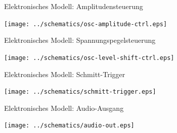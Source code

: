 \documentclass{beamer}
\begin{document}
\begin{frame}[fragile]{Elektronisches Modell: Amplitudensteuerung}
  \begin{center}
    \texttt{[image: ../schematics/osc-amplitude-ctrl.eps]}
  \end{center}
\end{frame}

\begin{frame}[fragile]{Elektronisches Modell: Spannungspegelsteuerung}
  \begin{center}
    \texttt{[image: ../schematics/osc-level-shift-ctrl.eps]}
  \end{center}
\end{frame}

\begin{frame}[fragile]{Elektronisches Modell: Schmitt-Trigger}
  \begin{center}
    \texttt{[image: ../schematics/schmitt-trigger.eps]}
  \end{center}
\end{frame}

\begin{frame}[fragile]{Elektronisches Modell: Audio-Ausgang}
  \begin{center}
    \texttt{[image: ../schematics/audio-out.eps]}
  \end{center}
\end{frame}
\end{document}
